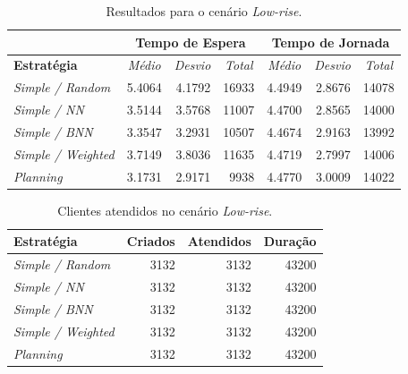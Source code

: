 \begin{table}[htb!]
\centering
\caption{Resultados para o cenário \textit{Low-rise}.}
\label{tab:results:lowrise}
\begin{tabular}{|l|r|r|r|r|r|r|}
\hline
\multicolumn{1}{|c|}{\textbf{}}                 & \multicolumn{3}{c|}{\textbf{Tempo de Espera}}                                                                    & \multicolumn{3}{c|}{\textbf{Tempo de Jornada}}                                                                                                                       \\ \hline
\textbf{Estratégia} & \multicolumn{1}{c|}{\textit{Médio}} & \multicolumn{1}{c|}{\textit{Desvio}} & \multicolumn{1}{c|}{\textit{Total}} & \multicolumn{1}{c|}{\textit{Médio}}                   & \multicolumn{1}{c|}{\textit{Desvio}}                  & \multicolumn{1}{c|}{\textit{Total}}                  \\ \hline
\textit{Simple / Random}          & 5.4064 & 4.1792 & 16933 & 4.4949 & 2.8676 & 14078 \\ \hline
\textit{Simple / NN}              & 3.5144 & 3.5768 & 11007 & 4.4700 & 2.8565 & 14000 \\ \hline
\textit{Simple / BNN}             & 3.3547 & 3.2931 & 10507 & \cellcolor[HTML]{67FD9A}4.4674 & 2.9163 & \cellcolor[HTML]{67FD9A}13992 \\ \hline
\textit{Simple / Weighted}        & 3.7149 & 3.8036 & 11635 & 4.4719 & \cellcolor[HTML]{67FD9A}2.7997 & 14006 \\ \hline
\textit{Planning}                 & \cellcolor[HTML]{67FD9A}3.1731 & \cellcolor[HTML]{67FD9A}2.9171 &  \cellcolor[HTML]{67FD9A}9938 & 4.4770 & 3.0009 & 14022 \\ \hline
\end{tabular}
\end{table}

\begin{table}[htb]
\centering
\caption{Clientes atendidos no cenário \textit{Low-rise}.}
\label{table:results:lowrise:clients}
\begin{tabular}{|l|r|r|r|}
\hline
\textbf{Estratégia}        & \multicolumn{1}{l|}{\textbf{Criados}} & \multicolumn{1}{l|}{\textbf{Atendidos}} & \multicolumn{1}{l|}{\textbf{Duração}} \\ \hline
\textit{Simple / Random}   & 3132 & 3132 & 43200 \\ \hline
\textit{Simple / NN}       & 3132 & 3132 & 43200 \\ \hline
\textit{Simple / BNN}      & 3132 & 3132 & 43200 \\ \hline
\textit{Simple / Weighted} & 3132 & 3132 & 43200 \\ \hline
\textit{Planning}          & 3132 & 3132 & 43200 \\ \hline
\end{tabular}
\end{table}

